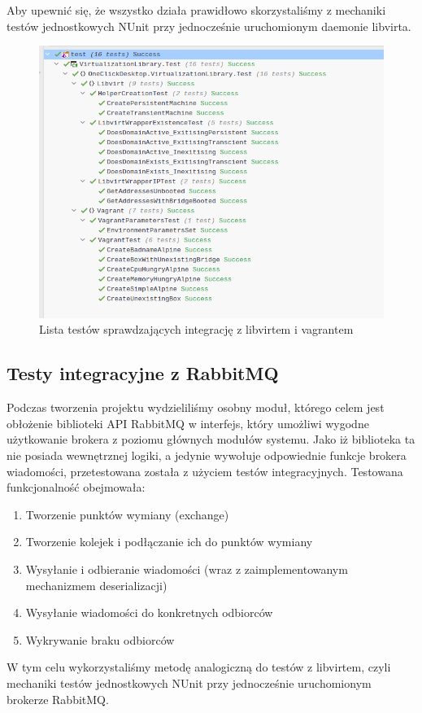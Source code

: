\documentclass[12pt]{article}
\begin{document}
Aby upewnić się, że wszystko działa prawidłowo skorzystaliśmy z mechaniki testów jednostkowych NUnit przy jednocześnie uruchomionym daemonie libvirta.

\begin{figure}[!h]
	\centering
	\includegraphics[width=0.7\linewidth]{res/virtsrvlib-test}
	\caption{Lista testów sprawdzających integrację z libvirtem i vagrantem}
	\label{fig:virtsrvlib-test}
\end{figure}

\subsection{Testy integracyjne z RabbitMQ}
Podczas tworzenia projektu wydzieliliśmy osobny moduł, którego celem jest obłożenie biblioteki API RabbitMQ w interfejs, który umożliwi wygodne użytkowanie brokera z poziomu głównych modułów systemu. Jako iż biblioteka ta nie posiada wewnętrznej logiki, a jedynie wywołuje odpowiednie funkcje brokera wiadomości, przetestowana została z użyciem testów integracyjnych. Testowana funkcjonalność obejmowała:
\begin{enumerate}
	\item Tworzenie punktów wymiany (exchange)
	\item Tworzenie kolejek i podłączanie ich do punktów wymiany
	\item Wysyłanie i odbieranie wiadomości (wraz z zaimplementowanym mechanizmem deserializacji)
	\item Wysyłanie wiadomości do konkretnych odbiorców
	\item Wykrywanie braku odbiorców
\end{enumerate}

W tym celu wykorzystaliśmy metodę analogiczną do testów z libvirtem, czyli mechaniki testów jednostkowych NUnit przy jednocześnie uruchomionym brokerze RabbitMQ.
\end{document}
